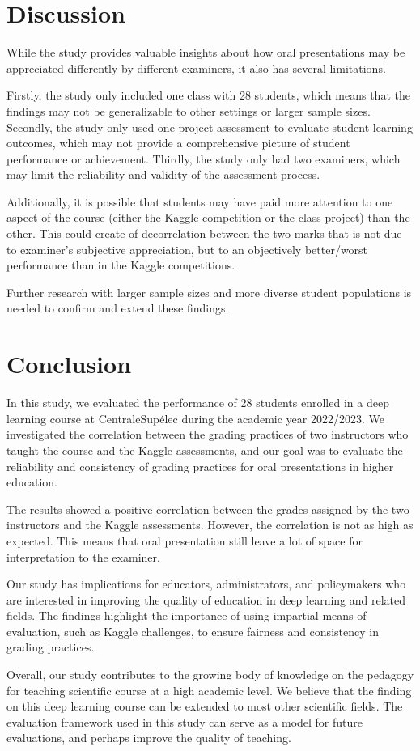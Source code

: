\documentclass[a4paper]{article}
\begin{document}
	\section{Discussion}
	While the study provides valuable insights about how oral presentations may be appreciated differently by different examiners, it also has several limitations.
	
	Firstly, the study only included one class with 28 students, which means that the findings may not be generalizable to other settings or larger sample sizes.
	Secondly, the study only used one project assessment to evaluate student learning outcomes, which may not provide a comprehensive picture of student performance or achievement.
	Thirdly, the study only had two examiners, which may limit the reliability and validity of the assessment process.
	
	Additionally, it is possible that students may have paid more attention to one aspect of the course (either the Kaggle competition or the class project) than the other.
	This could create of decorrelation between the two marks that is not due to examiner's subjective appreciation, but to an objectively better/worst performance than in the Kaggle competitions.
	
	Further research with larger sample sizes and more diverse student populations is needed to confirm and extend these findings.
	
	\section{Conclusion}
	In this study, we evaluated the performance of 28 students enrolled in a deep learning course at CentraleSupélec during the academic year 2022/2023.
	We investigated the correlation between the grading practices of two instructors who taught the course and the Kaggle assessments, and our goal was to evaluate the reliability and consistency of grading practices for oral presentations in higher education.
	
	The results showed a positive correlation between the grades assigned by the two instructors and the Kaggle assessments.
	However, the correlation is not as high as expected.
	This means that oral presentation still leave a lot of space for interpretation to the examiner.
	
	Our study has implications for educators, administrators, and policymakers who are interested in improving the quality of education in deep learning and related fields.
	The findings highlight the importance of using impartial means of evaluation, such as Kaggle challenges, to ensure fairness and consistency in grading practices.
	
	Overall, our study contributes to the growing body of knowledge on the pedagogy for teaching scientific course at a high academic level.
	We believe that the finding on this deep learning course can be extended to most other scientific fields.
	The evaluation framework used in this study can serve as a model for future evaluations, and perhaps improve the quality of teaching.
\end{document}
